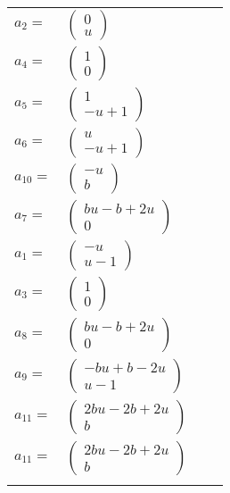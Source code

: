 \documentclass[1p]{elsarticle_modified}
\theoremstyle{definition}
\begin{document}
\begin{tabular}{m{7pt} m{180pt} m{7pt} m{180pt} }
\flushright $a_{2}=$&$\begin{pmatrix}0\\u\end{pmatrix}$ \\
\flushright $a_{4}=$&$\begin{pmatrix}1\\0\end{pmatrix}$ \\
\flushright $a_{5}=$&$\begin{pmatrix}1\\- u+1\end{pmatrix}$ \\
\flushright $a_{6}=$&$\begin{pmatrix}u\\- u+1\end{pmatrix}$ \\
\flushright $a_{10}=$&$\begin{pmatrix}- u\\b\end{pmatrix}$ \\
\flushright $a_{7}=$&$\begin{pmatrix}b u- b+2 u\\0\end{pmatrix}$ \\
\flushright $a_{1}=$&$\begin{pmatrix}- u\\u-1\end{pmatrix}$ \\
\flushright $a_{3}=$&$\begin{pmatrix}1\\0\end{pmatrix}$ \\
\flushright $a_{8}=$&$\begin{pmatrix}b u- b+2 u\\0\end{pmatrix}$ \\
\flushright $a_{9}=$&$\begin{pmatrix}- b u+b-2 u\\u-1\end{pmatrix}$ \\
\flushright $a_{11}=$&$\begin{pmatrix}2 b u-2 b+2 u\\b\end{pmatrix}$\\ \flushright $a_{11}=$&$\begin{pmatrix}2 b u-2 b+2 u\\b\end{pmatrix}$\\&\end{tabular}
\end{document}
